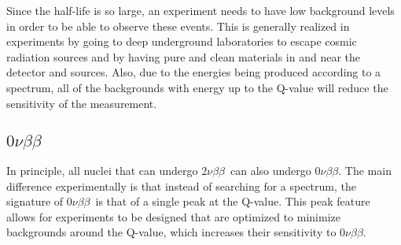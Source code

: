 \documentclass[12pt,a4paper]{article}
\newcommand{\zeronubb}{$0\nu \beta \beta$}
\newcommand{\twonubb}{$2\nu \beta \beta$}
\begin{document}
Since the half-life is so large, an experiment needs to have low background levels in order to be able to observe these events. This is generally realized in experiments by going to deep underground laboratories to escape cosmic radiation sources and by having pure and clean materials in and near the detector and sources. Also, due to the energies being produced according to a spectrum, all of the backgrounds with energy up to the Q-value will reduce the sensitivity of the measurement.

\begin{comment}
\begin{center}
\begin{tabular}{|c|c|c|}
\hline 
Isotope & Half-life, $10^{21}$ years & Experiment \\ \hline 
$^{48}\textrm{Ca}$ & $0.044^{+0.005}_{-0.004} \pm 0.004$ & Nemo-3 \\ \hline
$^{78}\textrm{Ge}$ & $1.84^{+0.09~+0.11}_{-0.08~-0.06}$ & GERDA (2013) \\ \hline
$^{82}\textrm{Se}$ & $0.096 \pm 0.003 \pm 0.010$ & NEMO-3 \\ \hline
$^{96}\textrm{Zr}$ & $0.0235 \pm 0.0014 \pm 0.0016$ & NEMO-3 \\ \hline
$^{100}\textrm{Mo}$ & $0.00711 \pm 0.00002 \pm 0.00054$ & NEMO-3 \\ \hline
$^{116}\textrm{Cd}$ & $0.028 \pm 0.001 \pm 0.003$ & NEMO-3 \\ \hline
$^{130}\textrm{Te}$ & $0.7 \pm 0.09\pm 0.11$ & NEMO-3 \\ \hline
$^{136}\textrm{Xe}$ & $2.165 \pm 0.016 \pm 0.059$ & EXO-200 \\ \hline
$^{150}\textrm{Nd}$ & $0.00911^{+0.00025}_{-0.00022}\pm 0.00063$ & NEMO-3 \\ \hline
\end{tabular} 
\end{center}
\end{comment}

\subsection{\zeronubb}
In principle, all nuclei that can undergo \twonubb~can also undergo \zeronubb. The main difference experimentally is that instead of searching for a spectrum, the signature of \zeronubb~is that of a single peak at the Q-value. This peak feature allows for experiments to be designed that are optimized to minimize backgrounds around the Q-value, which increases their sensitivity to \zeronubb. 
\end{document}
